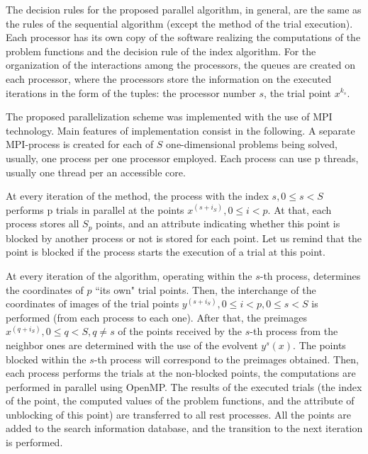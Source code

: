 \documentclass[runningheads]{llncs}
\begin{document}
The decision rules for the proposed parallel algorithm, in general, are the same as the rules of the
sequential algorithm (except the method of the trial execution). Each processor has its own copy
of the software realizing the computations of the problem functions and the decision rule of the
index algorithm. For the organization of the interactions among the processors, the queues are
created on each processor, where the processors store the information on the executed iterations
in the form of the tuples: the processor number \(s\), the trial point \(x{}^{k_s}\).
\par
The proposed parallelization scheme was implemented with the use of MPI technology. Main
features of implementation consist in the following. A separate MPI-process is created for each
of \(S\) one-dimensional problems being solved, usually, one process per one processor
employed. Each process can use p threads, usually one thread per an accessible core.
\par
At every iteration of the method, the process with the index \(s,0\leqslant s< S\) performs p
trials in parallel at the points \(x^{(s+i_S)},0\leqslant i<p\). At that, each process stores all
\(S_p\) points, and an attribute indicating whether this point is blocked by another process or
not is stored for each point. Let us remind that the point is blocked if the process starts the
execution of a trial at this point.
\par
At every iteration of the algorithm, operating within the \(s\)-th process, determines the
coordinates of \(p\) ``its own" trial points. Then, the interchange of the coordinates of images of
the trial points \(y^{(s+i_S)},0\leqslant i<p, 0\leqslant s< S\) is performed (from each process to
each one). After that, the preimages \(x^{(q+i_S)},0\leqslant q<S,q\not=s\) of the points
received by the \(s\)-th process from the neighbor ones are determined with the use of the
evolvent \(y^s (x)\). The points blocked within the \(s\)-th process will correspond to the
preimages obtained. Then, each process performs the trials at the non-blocked points, the
computations are performed in parallel using OpenMP. The results of the executed trials (the
index of the point, the computed values of the problem functions, and the attribute of
unblocking of this point) are transferred to all rest processes. All the points are added to the
search information database, and the transition to the next iteration is performed.

\end{document}
